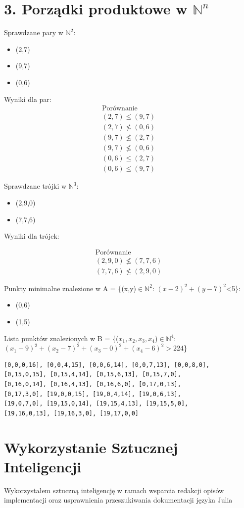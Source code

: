 \documentclass[12pt,a4paper]{article}
\begin{document}
\section*{3. Porządki produktowe w $\mathbb{N}^{n}$}
Sprawdzane pary w $\mathbb{N}^{2}$:
\begin{itemize}
    \item (2,7)
    \item (9,7)
    \item (0,6)
\end{itemize}
Wyniki dla par:
\[
\begin{array}{c}
\text{Porównanie} \\\hline
(2,7)\le(9,7) \\
(2,7)\not \le(0,6)\\
(9,7)\not \le(2,7)\\
(9,7)\not \le(0,6) \\
(0,6)\le(2,7) \\
(0,6)\le(9,7)
\end{array}
\]

Sprawdzane trójki w $\mathbb{N}^{3}$:
\begin{itemize}
    \item (2,9,0)
    \item (7,7,6)
\end{itemize}
Wyniki dla trójek:

\[
\begin{array}{c}
    \text{Porównanie}\\\hline
(2,9,0)\not \le(7,7,6)\\
(7,7,6)\not \le(2,9,0)
\end{array}
\]

Punkty minimalne znalezione w A = \{(x,y)$\in \mathbb{N}^{2}$: $(x-2)^{2}+(y-7)^{2}$<5\}:
\begin{itemize}
    \item (0,6)
    \item (1,5)
\end{itemize}

Lista punktów znalezionych w B = \{($x_{1},x_{2},x_{3},x_{4}$)$\in \mathbb{N}^{4}$: $(x_{1}-9)^{2} + (x_{2}-7)^{2} + (x_{3}-0)^{2} + (x_{4} - 6)^{2} > 224 $\}
{\scriptsize
\begin{lstlisting}
[0,0,0,16], [0,0,4,15], [0,0,6,14], [0,0,7,13], [0,0,8,0],
[0,15,0,15], [0,15,4,14], [0,15,6,13], [0,15,7,0],
[0,16,0,14], [0,16,4,13], [0,16,6,0], [0,17,0,13],
[0,17,3,0], [19,0,0,15], [19,0,4,14], [19,0,6,13],
[19,0,7,0], [19,15,0,14], [19,15,4,13], [19,15,5,0],
[19,16,0,13], [19,16,3,0], [19,17,0,0]
\end{lstlisting}
}

\section*{Wykorzystanie Sztucznej Inteligencji}
Wykorzystałem sztuczną inteligencję w ramach wsparcia redakcji opisów implementacji oraz usprawnienia przeszukiwania dokumentacji języka Julia
\end{document}
